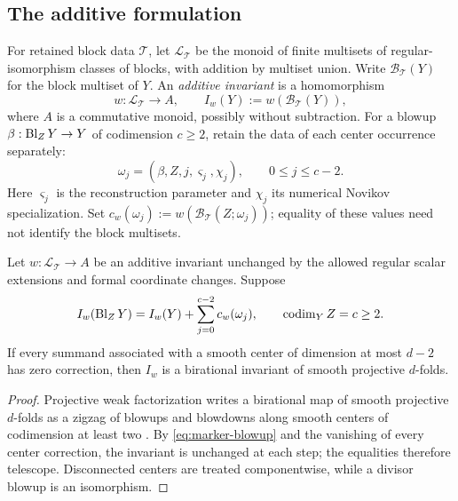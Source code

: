 \subsection{The additive formulation}
For retained block data \(\mathcal T\), let \(\mathcal L_{\mathcal T}\)
be the monoid of finite multisets of regular-isomorphism classes of blocks,
with addition by multiset union.  Write \(\mathcal B_{\mathcal T}(Y)\) for the
block multiset of \(Y\).  An \emph{additive invariant} is a homomorphism
\[
 w:\mathcal L_{\mathcal T}\longrightarrow A,
 \qquad I_w(Y):=w(\mathcal B_{\mathcal T}(Y)),
\]
where \(A\) is a commutative monoid, possibly without subtraction.  For a blowup
\(\beta:\operatorname{Bl}_ZY\to Y\) of codimension \(c\ge2\), retain the data of each
center occurrence separately:
\[
 \omega_j=(\beta,Z,j,\varsigma_j,\chi_j),
 \qquad 0\le j\le c-2.
\]
Here \(\varsigma_j\) is the reconstruction parameter and \(\chi_j\) its
numerical Novikov specialization.  Set
\(c_w(\omega_j):=w(\mathcal B_{\mathcal T}(Z;\omega_j))\);
equality of these values need not identify the block multisets.

\begin{theorem}
\label{thm:marker-ledger}
%
%
%
Let \(w:\mathcal L_{\mathcal T}\to A\) be an additive invariant unchanged by the
allowed regular scalar extensions and formal coordinate changes.  Suppose
\begin{equation}
 I_w(\operatorname{Bl}_ZY)=I_w(Y)+\sum_{j=0}^{c-2}c_w(\omega_j),
 \qquad\operatorname{codim}_YZ=c\ge2.\label{eq:marker-blowup}
\end{equation}
If every summand associated with a smooth center of dimension at most \(d-2\)
has zero correction, then \(I_w\) is a birational invariant of smooth
projective \(d\)-folds.
\end{theorem}

\begin{proof}
Projective weak factorization writes a birational map of smooth projective
\(d\)-folds as a zigzag of blowups and blowdowns along smooth centers of
codimension at least two \cite[Theorem~0.3.1]{AKMW}.  By
\eqref{eq:marker-blowup} and the vanishing of every center correction, the
invariant is unchanged at each step; the equalities therefore telescope.
Disconnected centers are treated componentwise, while a divisor blowup is an
isomorphism.
\end{proof}

